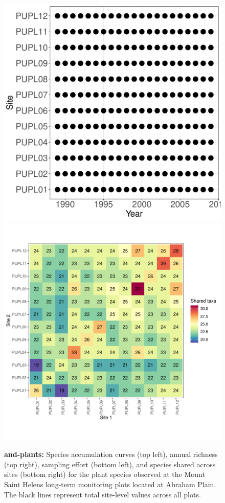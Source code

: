 \documentclass[11pt, oneside]{article}
\begin{document}
\begin{figure}[h!]
\includegraphics[scale = 0.4]{and-plants-mtStHelens_spatiotemporal_sampling_effort.pdf}
\includegraphics[scale = 0.4]{and-plants-mtStHelens_spp_shared.pdf}
\caption{{\bf and-plants:} Species accumulation curves (top left),  annual richness (top right), sampling effort (bottom left), and species shared across sites (bottom right) for the plant species observed at the Mount Saint Helens long-term monitoring plots located at Abraham Plain. The black lines represent total site-level values across all plots.}
\label{and-plants}
\end{figure}
\end{document}
